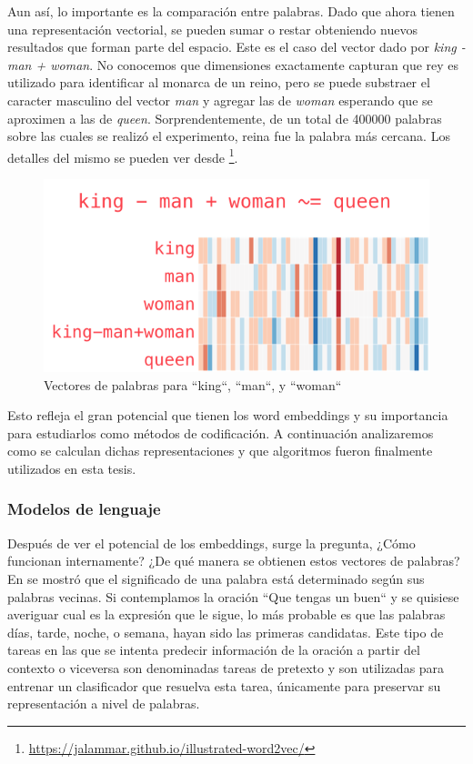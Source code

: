Aun así, lo importante es la comparación entre palabras. Dado que ahora tienen
una representación vectorial, se pueden sumar o restar obteniendo nuevos
resultados que forman parte del espacio. Este es el caso del vector dado por
\emph{king - man + woman}. No conocemos que dimensiones exactamente capturan que
rey es utilizado para identificar al monarca de un reino, pero se puede
substraer el caracter masculino del vector \emph{man} y agregar las de
\emph{woman} esperando que se aproximen a las de \emph{queen}.
Sorprendentemente, de un total de 400000 palabras sobre las cuales se realizó el
experimento, reina fue la palabra más cercana. Los detalles del mismo se pueden
ver desde \footnote{\url{https://jalammar.github.io/illustrated-word2vec/}}.

\begin{figure}
    \centering
    \includegraphics[scale=0.68]{figures/king-analogy-viz.png}
    \caption{Vectores de palabras para ``king``, ``man``, y ``woman``}
    \label{fig:king-queen-example}
\end{figure}

Esto refleja el gran potencial que tienen los word embeddings y su importancia
para estudiarlos como métodos de codificación. A continuación analizaremos como
se calculan dichas representaciones y que algoritmos fueron finalmente
utilizados en esta tesis.

\subsubsection{Modelos de lenguaje}

Después de ver el potencial de los embeddings, surge la pregunta, ¿Cómo
funcionan internamente? ¿De qué manera se obtienen estos vectores de palabras?
En \citep{firth-57} se mostró que el significado de una palabra está determinado
según sus palabras vecinas. Si contemplamos la oración ``Que tengas un buen`` y
se quisiese averiguar cual es la expresión que le sigue, lo más probable es que
las palabras días, tarde, noche, o semana, hayan sido las primeras candidatas.
Este tipo de tareas en las que se intenta predecir información de la oración a
partir del contexto o viceversa son denominadas tareas de pretexto y son
utilizadas para entrenar un clasificador que resuelva esta tarea, únicamente
para preservar su representación a nivel de palabras.

